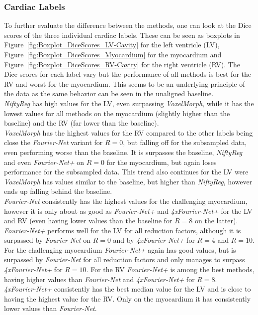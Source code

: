 \subsubsection{Cardiac Labels}
To further evaluate the difference between the methods, one can look at the Dice scores of the three individual cardiac labels. These can be seen as boxplots in Figure~\ref{fig:Boxplot_DiceScores_LV-Cavity} for the left ventricle (LV), Figure~\ref{fig:Boxplot_DiceScores_Myocardium} for the myocardium and Figure~\ref{fig:Boxplot_DiceScores_RV-Cavity} for the right ventricle (RV). The Dice scores for each label vary but the performance of all methods is best for the RV and worst for the myocardium. This seems to be an underlying principle of the data as the same behavior can be seen in the unaligned baseline. \\
\emph{NiftyReg} has high values for the LV, even surpassing \emph{VoxelMorph}, while it has the lowest values for all methods on the myocardium (slightly higher than the baseline) and the RV (far lower than the baseline). \\
\emph{VoxelMorph} has the highest values for the RV compared to the other labels being close the \emph{Fourier-Net} variant for $R=0$, but falling off for the subsampled data, even performing worse than the baseline. It is surpasses the baseline, \emph{NiftyReg} and even \emph{Fourier-Net+} on $R=0$ for the myocardium, but again loses performance for the subsampled data. This trend also continues for the LV were \emph{VoxelMorph} has values similar to the baseline, but higher than \emph{NiftyReg}, however ends up falling behind the baseline. \\
\emph{Fourier-Net} consistently has the highest values for the challenging myocardium, however it is only about as good as \emph{Fourier-Net+} and \emph{4xFourier-Net+} for the LV and RV (even having lower values than the baseline for $R=8$ on the latter). \\
\emph{Fourier-Net+} performs well for the LV for all reduction factors, although it is surpassed by \emph{Fourier-Net} on $R=0$ and by \emph{4xFourier-Net+} for $R=4$ and $R=10$. For the challenging myocardium \emph{Fourier-Net+} again has good values, but is surpassed by \emph{Fourier-Net} for all reduction factors and only manages to surpass \emph{4xFourier-Net+} for $R=10$. For the RV \emph{Fourier-Net+} is among the best methods, having higher values than \emph{Fourier-Net} and \emph{4xFourier-Net+} for $R=8$.\\
\emph{4xFourier-Net+} consistently has the best median value for the LV and is close to having the highest value for the RV. Only on the myocardium it has consistently lower values than \emph{Fourier-Net}.


